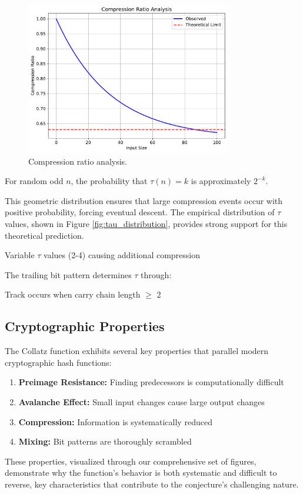 \begin{figure}[h]
\centering
\includegraphics[width=0.8\textwidth]{py_visuals/figures/compression_ratio.pdf}
\caption{Compression ratio analysis.}
\label{fig:compression_ratio_crypto}
\end{figure}

\begin{theorem}\label{thm:compression}
For random odd $n$, the probability that $\tau(n) = k$ is approximately $2^{-k}$.
\end{theorem}

This geometric distribution ensures that large compression events occur with positive probability, forcing eventual descent. The empirical distribution of $\tau$ values, shown in Figure \ref{fig:tau_distribution}, provides strong support for this theoretical prediction.

Variable $\tau$ values (2-4) causing additional compression

The trailing bit pattern determines $\tau$ through:

Track occurs when carry chain length $\geq$ 2

\subsection{Cryptographic Properties}

The Collatz function exhibits several key properties that parallel modern cryptographic hash functions:

\begin{enumerate}
\item \textbf{Preimage Resistance:} Finding predecessors is computationally difficult
\item \textbf{Avalanche Effect:} Small input changes cause large output changes
\item \textbf{Compression:} Information is systematically reduced
\item \textbf{Mixing:} Bit patterns are thoroughly scrambled
\end{enumerate}

These properties, visualized through our comprehensive set of figures, demonstrate why the function's behavior is both systematic and difficult to reverse, key characteristics that contribute to the conjecture's challenging nature. 
